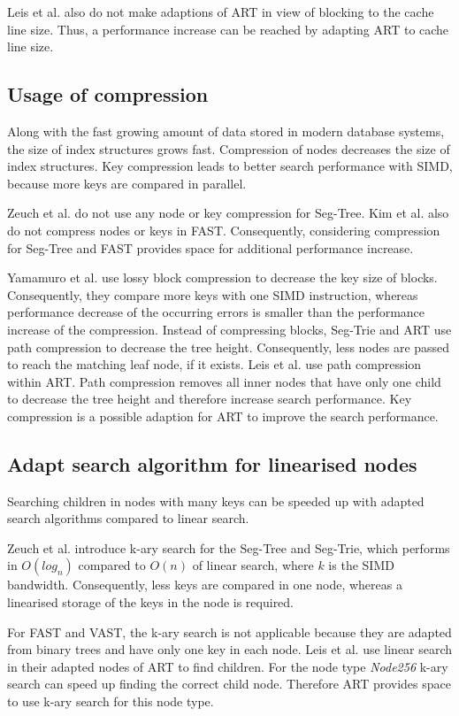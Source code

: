 \documentclass[conference]{IEEEtran}
\begin{document}
Leis et al. also do not make adaptions of ART in view of blocking to the cache line size. Thus, a performance increase can be reached by adapting ART to cache line size.
\subsection{Usage of compression}
Along with the fast growing amount of data stored in modern database systems, the size of index structures grows fast. Compression of nodes decreases the size of index structures. Key compression leads to better search performance with SIMD, because more keys are compared in parallel.

Zeuch et al. do not use any node or key compression for Seg-Tree. Kim et al. also do not compress nodes or keys in FAST. Consequently, considering compression for Seg-Tree and FAST provides space for additional performance increase.

Yamamuro et al. use lossy block compression to decrease the key size of blocks. Consequently, they compare more keys with one SIMD instruction, whereas performance decrease of the occurring errors is smaller than the performance increase of the compression. Instead of compressing blocks, Seg-Trie and ART use path compression to decrease the tree height. Consequently, less nodes are passed to reach the matching leaf node, if it exists.
Leis et al. use path compression within ART. Path compression removes all inner nodes that have only one child to decrease the tree height and therefore increase search performance. Key compression is a possible adaption for ART to improve the search performance.

\subsection{Adapt search algorithm for linearised nodes}
Searching children in nodes with many keys can be speeded up with adapted search algorithms compared to linear search.

Zeuch et al. introduce k-ary search for the Seg-Tree and Seg-Trie, which performs in $O(log_n)$ compared to $O(n)$ of linear search, where $k$ is the SIMD bandwidth. Consequently, less keys are compared in one node, whereas a linearised storage of the keys in the node is required. 

For FAST and VAST, the k-ary search is not applicable because they are adapted from binary trees and have only one key in each node. Leis et al. use linear search in their adapted nodes of ART to find children. For the node type \emph{Node256} k-ary search can speed up finding the correct child node. Therefore ART provides space to use k-ary search for this node type.
\end{document}
